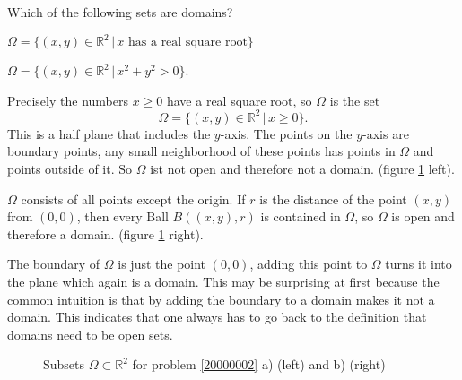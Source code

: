 Which of the following sets are domains?
\begin{teilaufgaben}
\item $\Omega=\{(x,y)\in\mathbb R^2\,|\, \text{$x$ has a real square root}\}$
\item $\Omega=\{(x,y)\in\mathbb R^2\,|\, x^2+y^2>0\}$.
\end{teilaufgaben}


\begin{loesung}
\begin{teilaufgaben}
\item
Precisely the numbers
$x\ge 0$ have a real square root, so $\Omega$ is the set
\[
\Omega=\{(x,y)\in\mathbb R^2\,|\, x\ge 0\}.
\]
This is a half plane that includes the $y$-axis.
The points on the $y$-axis are boundary points, any small neighborhood of
these points has points in $\Omega$ and points outside of it.
So $\Omega$ ist not open and therefore not a domain.
(figure \ref{20000002:fig} left).
\item
$\Omega$ consists of all points except the origin.
If $r$ is the distance of the point $(x,y)$ from $(0,0)$, then every
Ball
$B((x,y),r)$ is contained in $\Omega$, so $\Omega$ is open and therefore
a domain.
(figure \ref{20000002:fig} right).

The boundary of $\Omega$ is just the point $(0,0)$, adding this point
to $\Omega$ turns it into the plane which again is a domain.
This may be surprising at first because the common intuition is that
by adding the boundary to a domain makes it not a domain.
This indicates that one always has to go back to the definition
that domains need to be open sets.
\qedhere
\end{teilaufgaben}
\begin{figure}
\begin{center}
\qquad
{}
\end{center}
\caption{Subsets $\Omega\subset\mathbb R^2$ for problem \ref{20000002} a)
(left) 
and b) (right)\label{20000002:fig}}
\end{figure}
\end{loesung}
